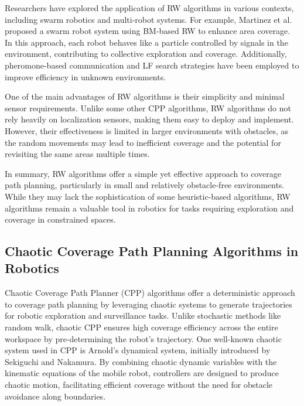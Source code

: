 Researchers have explored the application of RW algorithms in various contexts, including swarm robotics and multi-robot systems. For example, Martinez et al. proposed a swarm robot system using BM-based RW to enhance area coverage. In this approach, each robot behaves like a particle controlled by signals in the environment, contributing to collective exploration and coverage. Additionally, pheromone-based communication and LF search strategies have been employed to improve efficiency in unknown environments.

\vspace*{6mm}

One of the main advantages of RW algorithms is their simplicity and minimal sensor requirements. Unlike some other CPP algorithms, RW algorithms do not rely heavily on localization sensors, making them easy to deploy and implement. However, their effectiveness is limited in larger environments with obstacles, as the random movements may lead to inefficient coverage and the potential for revisiting the same areas multiple times.

\vspace*{6mm}

In summary, RW algorithms offer a simple yet effective approach to coverage path planning, particularly in small and relatively obstacle-free environments. While they may lack the sophistication of some heuristic-based algorithms, RW algorithms remain a valuable tool in robotics for tasks requiring exploration and coverage in constrained spaces.

\subsection{Chaotic Coverage Path Planning Algorithms in Robotics}

Chaotic Coverage Path Planner (CPP) algorithms offer a deterministic approach to coverage path planning by leveraging chaotic systems to generate trajectories for robotic exploration and surveillance tasks. Unlike stochastic methods like random walk, chaotic CPP ensures high coverage efficiency across the entire workspace by pre-determining the robot's trajectory. One well-known chaotic system used in CPP is Arnold's dynamical system, initially introduced by Sekiguchi and Nakamura. By combining chaotic dynamic variables with the kinematic equations of the mobile robot, controllers are designed to produce chaotic motion, facilitating efficient coverage without the need for obstacle avoidance along boundaries.

